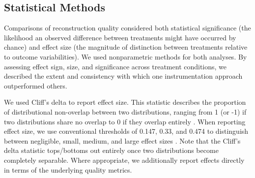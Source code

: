 
\subsection{Statistical Methods}

Comparisons of reconstruction quality considered both statistical significance (the likelihood an observed difference between treatments might have occurred by chance) and effect size (the magnitude of distinction between treatments relative to outcome variabilities).
We used nonparametric methods for both analyses.
By assessing effect sign, size, and significance across treatment conditions, we described the extent and consistency with which one instrumentation approach outperformed others.

We used Cliff's delta to report effect size.
This statistic describes the proportion of distributional non-overlap between two distributions, ranging from 1 (or -1) if two distributions share no overlap to 0 if they overlap entirely \citep{cliff1993dominance}.
When reporting effect size, we use conventional thresholds of 0.147, 0.33, and 0.474 to distinguish between negligible, small, medium, and large effect sizes \citep{hess2004robust}.
Note that the Cliff's delta statistic tops/bottoms out entirely once two distributions become completely separable.
Where appropriate, we additionally report effects directly in terms of the underlying quality metrics.

